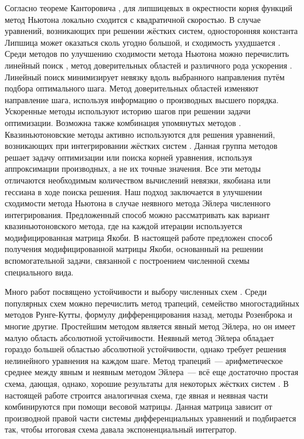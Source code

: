 Согласно теореме Канторовича \cite{kantorovich1949method,ortega2000iterative}, для липшицевых в окрестности корня функций метод Ньютона локально сходится с квадратичной скоростью.
В случае уравнений, возникающих при решении жёстких систем, односторонняя константа Липшица может оказаться сколь угодно большой, и сходимость ухудшается \cite{auzinger1990note, auzinger1993modern}.
Среди методов по улучшению сходимости метода Ньютона можно перечислить линейный поиск \cite{armijo1966minimization, wolfe1969convergence},
метод доверительных областей \cite{sorensen1982newton} и различного рода ускорения \cite{anderson1965iterative, nesterov27method, brown1994convergence}.
Линейный поиск минимизирует невязку вдоль выбранного направления путём подбора оптимального шага.
Метод доверительных областей изменяют направление шага, используя информацию о производных высшего порядка.
Ускоренные методы используют историю шагов при решении задачи оптимизации.
Возможна также комбинация упомянутых методов \cite{brune2015composing}.
Квазиньютоновские методы активно используются для решения уравнений, возникающих при интегрировании жёстких систем
\cite{brown1985experiments, alexander1991modified, moore1994stepsize, schlenkrich2006application}.
Данная группа методов решает задачу оптимизации или поиска корней уравнения, используя аппроксимации производных, а не их точные значения.
Все эти методы отличаются необходимым количеством вычислений невязки, якобиана или гессиана в ходе поиска решения.
Наш подход заключается в улучшении сходимости метода Ньютона в случае неявного метода Эйлера численного интегрирования.
Предложенный способ можно рассматривать как вариант квазиньютоновского метода, где на каждой итерации используется модифицированная матрица Якоби.
В настоящей работе предложен способ получения модифицированной матрицы Якоби, основанный на решении вспомогательной задачи,
связанной с построением численной схемы специального вида.

Много работ посвящено устойчивости и выбору численных схем \cite{auzinger1993modern, dahlquist1963special, dahlquist1975stability, liu2019study}.
Среди популярных схем можно перечислить метод трапеций, семейство многостадийных методов Рунге-Кутты, формулу дифференцирования назад, методы Розенброка и многие другие.
Простейшим методом является явный метод Эйлера, но он имеет малую область абсолютной устойчивости.
Неявный метод Эйлера обладает гораздо большей областью абсолютной устойчивости, однако требует решения нелинейного уравнения на каждом шаге.
Метод трапеций~--- арифметическое среднее между явным и неявным методом Эйлера~--- всё еще достаточно простая схема,
дающая, однако, хорошие результаты для некоторых жёстких систем \cite{auzinger1989asymptotic}.
В настоящей работе строится аналогичная схема, где явная и неявная части комбинируются при помощи весовой матрицы.
Данная матрица зависит от производной правой части системы дифференциальных уравнений и подбирается так, чтобы итоговая схема давала экспоненциальный интегратор.

